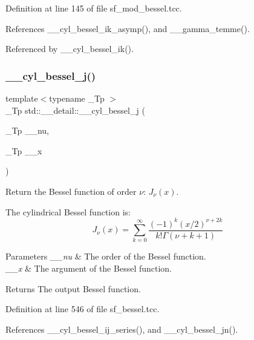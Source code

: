 Definition at line 145 of file sf\+\_\+mod\+\_\+bessel.\+tcc.



References \+\_\+\+\_\+cyl\+\_\+bessel\+\_\+ik\+\_\+asymp(), and \+\_\+\+\_\+gamma\+\_\+temme().



Referenced by \+\_\+\+\_\+cyl\+\_\+bessel\+\_\+ik().

\mbox{\label{namespacestd_1_1____detail_a9909fc0c463a7f0b9259fe02e15fce55}} 
\subsubsection{\texorpdfstring{\+\_\+\+\_\+cyl\+\_\+bessel\+\_\+j()}{\_\_cyl\_bessel\_j()}}
{\footnotesize\ttfamily template$<$typename \+\_\+\+Tp $>$ \\
\+\_\+\+Tp std\+::\+\_\+\+\_\+detail\+::\+\_\+\+\_\+cyl\+\_\+bessel\+\_\+j (\begin{DoxyParamCaption}\item[{\+\_\+\+Tp}]{\+\_\+\+\_\+nu,  }\item[{\+\_\+\+Tp}]{\+\_\+\+\_\+x }\end{DoxyParamCaption})}



Return the Bessel function of order $ \nu $\+: $ J_{\nu}(x) $. 

The cylindrical Bessel function is\+: \[ J_{\nu}(x) = \sum_{k=0}^{\infty} \frac{(-1)^k (x/2)^{\nu + 2k}}{k!\Gamma(\nu+k+1)} \]


\begin{DoxyParams}{Parameters}
{\em \+\_\+\+\_\+nu} & The order of the Bessel function. \\
\hline
{\em \+\_\+\+\_\+x} & The argument of the Bessel function. \\
\hline
\end{DoxyParams}
\begin{DoxyReturn}{Returns}
The output Bessel function. 
\end{DoxyReturn}


Definition at line 546 of file sf\+\_\+bessel.\+tcc.



References \+\_\+\+\_\+cyl\+\_\+bessel\+\_\+ij\+\_\+series(), and \+\_\+\+\_\+cyl\+\_\+bessel\+\_\+jn().

